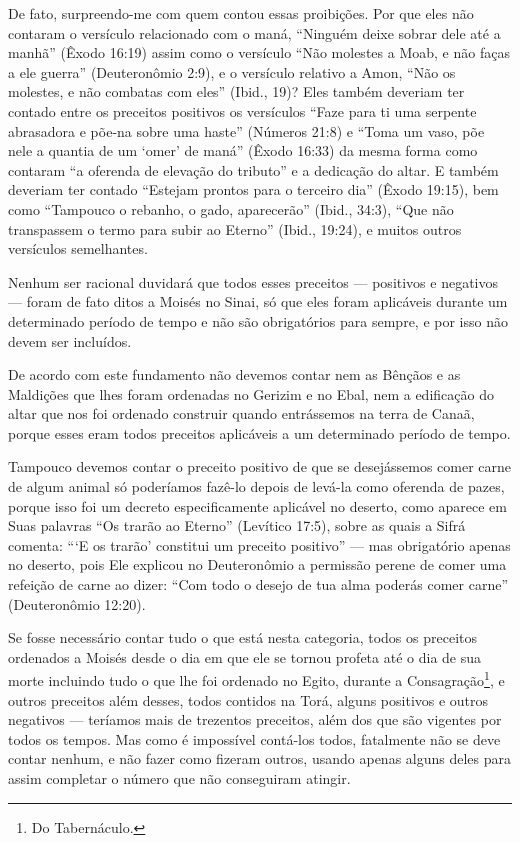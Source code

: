 De fato, surpreendo-me com quem contou essas proibições. Por que eles
não contaram o versículo relacionado com o maná, ``Ninguém deixe sobrar
dele até a manhã'' (Êxodo 16:19) assim como o versículo ``Não molestes a
Moab, e não faças a ele guerra'' (Deuteronômio 2:9), e o versículo
relativo a Amon, ``Não os molestes, e não combatas com eles'' (Ibid.,
19)? Eles também deveriam ter contado entre os preceitos positivos os
versículos ``Faze para ti uma serpente abrasadora e põe-na sobre uma
haste'' (Números 21:8) e ``Toma um vaso, põe nele a quantia de um `omer'
de maná'' (Êxodo 16:33) da mesma forma como contaram
``a oferenda de elevação do tributo'' e a dedicação do altar. E também
deveriam ter contado ``Estejam prontos para o terceiro dia'' (Êxodo
19:15), bem como ``Tampouco o rebanho, o gado, aparecerão'' (Ibid.,
34:3), ``Que não transpassem o termo para subir ao Eterno'' (Ibid.,
19:24), e muitos outros versículos semelhantes.

Nenhum ser racional duvidará que todos esses preceitos --- positivos e
negativos --- foram de fato ditos a Moisés no Sinai, só que eles foram
aplicáveis durante um determinado período de tempo e não são
obrigatórios para sempre, e por isso não devem ser incluídos.

De acordo com este fundamento não devemos contar nem as Bênçãos e as Maldições que lhes foram ordenadas no Gerizim e no Ebal, nem a
edificação do altar que nos foi ordenado construir quando entrássemos
na terra de Canaã, porque esses eram todos preceitos aplicáveis a um
determinado período de tempo.

Tampouco devemos contar o preceito positivo de que se desejássemos
comer carne de algum animal só poderíamos fazê-lo depois de levá-la
como oferenda de pazes, porque isso foi um decreto especificamente
aplicável no deserto, como aparece em Suas palavras ``Os trarão ao
Eterno'' (Levítico 17:5), sobre as quais a Sifrá comenta: ```E os
trarão' constitui um preceito positivo'' --- mas obrigatório apenas no
deserto, pois Ele explicou no Deuteronômio a permissão perene de comer
uma refeição de carne ao dizer: ``Com todo o desejo de tua alma poderás
comer carne'' (Deuteronômio 12:20).

Se fosse necessário contar tudo o que está nesta categoria, todos os
preceitos ordenados a Moisés desde o dia em que ele se tornou profeta
até o dia de sua morte incluindo tudo o que lhe foi ordenado no Egito,
durante a Consagração\footnote{Do Tabernáculo.}, e outros preceitos além
desses, todos contidos na Torá, alguns positivos e outros negativos
--- teríamos mais de trezentos preceitos, além dos que são vigentes por
todos os tempos. Mas como é impossível contá-los todos, fatalmente não
se deve contar nenhum, e não fazer como fizeram outros, usando apenas
alguns deles para assim completar o número que não conseguiram atingir.

